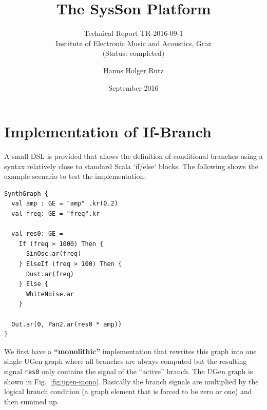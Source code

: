 \documentclass[11pt,a4paper]{article}
\title{The SysSon Platform}
\subtitle{Technical Report TR-2016-09-1\\Institute of Electronic Music and Acoustics, Graz\\(Status: completed)}
\author{Hanns Holger Rutz}
\date{September 2016}
\newcommand{\figref}[1]{Fig.~\ref{#1}}
\begin{document}
\maketitle
{}
\thispagestyle{empty}
\newpage
\section{Implementation of If-Branch}

A small DSL is provided that allows the definition of conditional branches using a syntax relatively close to standard Scala `if/else` blocks. The following shows the example scenario to test the implementation:
%
\begin{verbatim}
SynthGraph {
  val amp : GE = "amp" .kr(0.2)
  val freq: GE = "freq".kr

  val res0: GE = 
    If (freq > 1000) Then {
      SinOsc.ar(freq)
    } ElseIf (freq > 100) Then {
      Dust.ar(freq)
    } Else {
      WhiteNoise.ar
    }

  Out.ar(0, Pan2.ar(res0 * amp))
}
\end{verbatim}
%
We first have a \textbf{``monolithic''} implementation that rewrites this graph into one single UGen graph where all branches are always computed but the resulting signal \Verb!res0! only contains the signal of the ``active'' branch. The UGen graph is shown in \figref{fig:ugen-mono}. Basically the branch signals are multiplied by the logical branch condition (a graph element that is forced to be zero or one) and then summed up.
\end{document}

